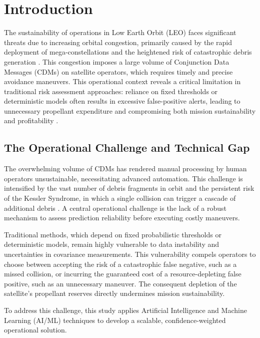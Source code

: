\documentclass[12pt, a4paper]{article}
\begin{document}
\newpage

\tableofcontents
\newpage

\section{Introduction}

The sustainability of operations in Low Earth Orbit (LEO) faces significant threats due to increasing orbital congestion, primarily caused by the rapid deployment of mega-constellations and the heightened risk of catastrophic debris generation \cite{ref1}. This congestion imposes a large volume of Conjunction Data Messages (CDMs) on satellite operators, which requires timely and precise avoidance maneuvers. This operational context reveals a critical limitation in traditional risk assessment approaches: reliance on fixed thresholds or deterministic models often results in excessive false-positive alerts, leading to unnecessary propellant expenditure and compromising both mission sustainability and profitability \cite{ref2}.

\subsection{The Operational Challenge and Technical Gap}

The overwhelming volume of CDMs has rendered manual processing by human operators unsustainable, necessitating advanced automation. This challenge is intensified by the vast number of debris fragments in orbit and the persistent risk of the Kessler Syndrome, in which a single collision can trigger a cascade of additional debris \cite{ref2}. A central operational challenge is the lack of a robust mechanism to assess prediction reliability before executing costly maneuvers.

Traditional methods, which depend on fixed probabilistic thresholds or deterministic models, remain highly vulnerable to data instability and uncertainties in covariance measurements. This vulnerability compels operators to choose between accepting the risk of a catastrophic false negative, such as a missed collision, or incurring the guaranteed cost of a resource-depleting false positive, such as an unnecessary maneuver. The consequent depletion of the satellite's propellant reserves directly undermines mission sustainability.

To address this challenge, this study applies Artificial Intelligence and Machine Learning (AI/ML) techniques to develop a scalable, confidence-weighted operational solution.
\end{document}
